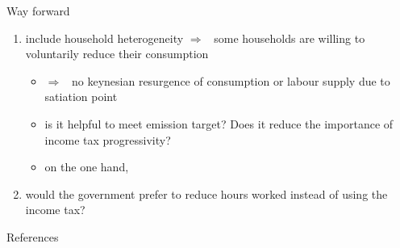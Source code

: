 \documentclass[11pt,aspectratio=169]{beamer}
\newcommand{\ar}{$\Rightarrow$ \ }
\begin{document}
\begin{frame}{Way forward}
\begin{enumerate}
	\item include household heterogeneity \ar some households are willing to voluntarily reduce their consumption
	\begin{itemize}
		\item \ar no keynesian resurgence of consumption or labour supply due to satiation point
		\item is it helpful to meet emission target? Does it reduce the importance of income tax progressivity?
		\item on the one hand, 
	\end{itemize}
\item would the government prefer to reduce hours worked instead of using the income tax?
\end{enumerate}
\end{frame}


\begin{frame}[shrink]{References}
	
	
	
\end{frame}
\end{document}
